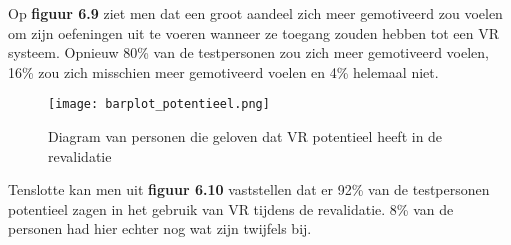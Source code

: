 Op \textbf{figuur 6.9} ziet men dat een groot aandeel zich meer gemotiveerd zou voelen om zijn oefeningen uit te voeren wanneer ze toegang zouden hebben tot een VR systeem. Opnieuw 80\% van de testpersonen zou zich meer gemotiveerd voelen, 16\% zou zich misschien meer gemotiveerd voelen en 4\% helemaal niet.


\begin{figure}[h]
    \centering
    \texttt{[image: barplot\_potentieel.png]}
    \caption{Diagram van personen die geloven dat VR potentieel heeft in de revalidatie}
    \label{figuur 6.10}
\end{figure}


Tenslotte kan men uit \textbf{figuur 6.10} vaststellen dat er 92\% van de testpersonen potentieel zagen in het gebruik van VR tijdens de revalidatie. 8\% van de personen had hier echter nog wat zijn twijfels bij.
